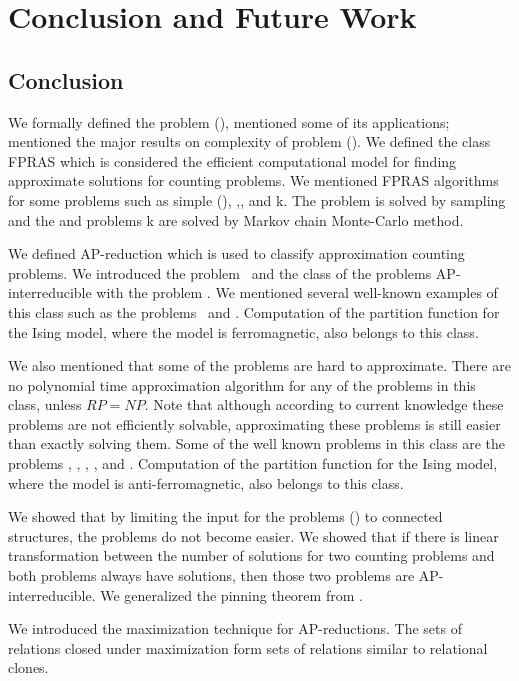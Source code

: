 \chapter{Conclusion and Future Work}
\section{Conclusion}
We formally defined the problem \ccsp(\mrelset), mentioned some of its applications; mentioned the 
major results on complexity of problem \ccsp(\mrelset). We defined the
class FPRAS which is considered the efficient computational model for finding approximate solutions
for counting problems.
We mentioned FPRAS algorithms for some problems such as simple \ccsp(\mrelset),
,, and k.
The problem  is solved by sampling and the  and problems 
k are solved by Markov chain Monte-Carlo method. 

We defined AP-reduction which is used to classify approximation counting problems.
We introduced the problem \cbis\ and the class of the problems AP-interreducible with
the problem \cbis\@. We mentioned several well-known examples of this class such as
the  problems \cdsp\ and \@. Computation of the partition function for 
the Ising model, where the model is ferromagnetic, also belongs to this class.

We also mentioned that some of the problems are hard to approximate. There are
no polynomial time approximation algorithm for any of the problems in this class, unless \(RP=NP\)\@.
Note that although according to current knowledge these problems are not efficiently solvable,
approximating these problems is still easier than exactly solving them.
Some of the well known problems in this 
class are the problems \cdsat, \ctsat, \csat, \cisp, and \ctcol\@. Computation
of the partition function for 
the Ising model, where the model is anti-ferromagnetic, also belongs to this class.

We showed that by limiting the input for the problems \ccsp(\mrelset) to connected structures,
the problems do not become easier. We showed that if there is linear transformation 
between the number of solutions for two counting problems and 
both problems always have solutions, then those two problems are AP-interreducible.
We generalized the pinning theorem from \cite{Trichotomy}\@. 

We introduced the maximization technique for AP-reductions. The sets of relations closed
under maximization form sets of relations similar to relational clones.

